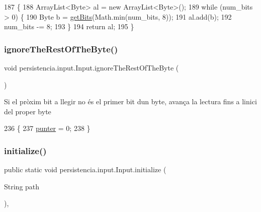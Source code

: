 \begin{DoxyCode}
187     \{
188         ArrayList<Byte> al = \textcolor{keyword}{new} ArrayList<Byte>();
189         \textcolor{keywordflow}{while} (num\_bits > 0) \{
190             Byte b = \hyperlink{classpersistencia_1_1input_1_1Input_a3fa5a378b2155a3022a4a4ef38d63a8e}{getBits}(Math.min(num\_bits, 8));
191             al.add(b);
192             num\_bits -= 8;
193         \}
194         \textcolor{keywordflow}{return} al;
195     \}
\end{DoxyCode}
\mbox{\label{classpersistencia_1_1input_1_1Input_a2b9b57fce6cb83efe70d5dc205737249}} 
\subsubsection{\texorpdfstring{ignore\+The\+Rest\+Of\+The\+Byte()}{ignoreTheRestOfTheByte()}}
{\footnotesize\ttfamily void persistencia.\+input.\+Input.\+ignore\+The\+Rest\+Of\+The\+Byte (\begin{DoxyParamCaption}{ }\end{DoxyParamCaption})\hspace{0.3cm}{\ttfamily [inline]}}

Si el pròxim bit a llegir no és el primer bit d\textquotesingle{}un byte, avança la lectura fins a l\textquotesingle{}inici del proper byte 
\begin{DoxyCode}
236                                          \{
237         \hyperlink{classpersistencia_1_1input_1_1Input_abe76388d0ac9eeafdba673ad2138f8dc}{punter} = 0;
238     \}
\end{DoxyCode}
\mbox{\label{classpersistencia_1_1input_1_1Input_abe53dec7aca98b94d0ec5e3200483513}} 
\subsubsection{\texorpdfstring{initialize()}{initialize()}}
{\footnotesize\ttfamily public static void persistencia.\+input.\+Input.\+initialize (\begin{DoxyParamCaption}\item[{String}]{path }\end{DoxyParamCaption})\hspace{0.3cm}{\ttfamily [inline]}, {\ttfamily [static]}}



